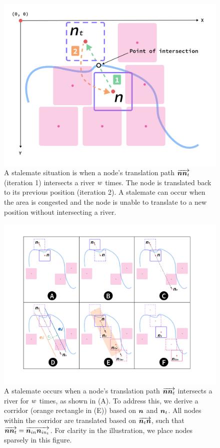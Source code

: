    {
        \begin{figure}[tb!]
            \centering
            \includegraphics[width=\columnwidth,keepaspectratio]{figure/stalemate.png}
            \caption{A stalemate situation is when a node's translation path $ \protect\overrightarrow{\bm{n}\bm{n}_t} $ (iteration 1) intersects a river $ w $ times. The node is translated back to its previous position (iteration 2). A stalemate can occur when the area is congested and the node is unable to translate to a new position without intersecting a river.}
            \label{fig:stalemate}
        \end{figure}
    }

    {
        \begin{figure}[tb!]
            \centering
            \includegraphics[width=\columnwidth,keepaspectratio]{figure/corridor.png}
            \caption{A stalemate occurs when a node's translation path $ \protect\overrightarrow{\bm{n}\bm{n}_t} $ intersects a river for $ w $ times, as shown in (A). To address this, we derive a corridor (orange rectangle in (E)) based on $ \bm{n} $ and $ \bm{n}_t $. All nodes within the corridor are translated based on $ \protect\overrightarrow{\bm{n}_t\bm{n}} $, such that $ \protect\overrightarrow{\bm{n}\bm{n}_{t}} = \protect\overrightarrow{\bm{n}_{in}\bm{n}_{in_t}} $. For clarity in the illustration, we place nodes sparsely in this figure.}
            \label{fig:corridor}
        \end{figure}
    }

